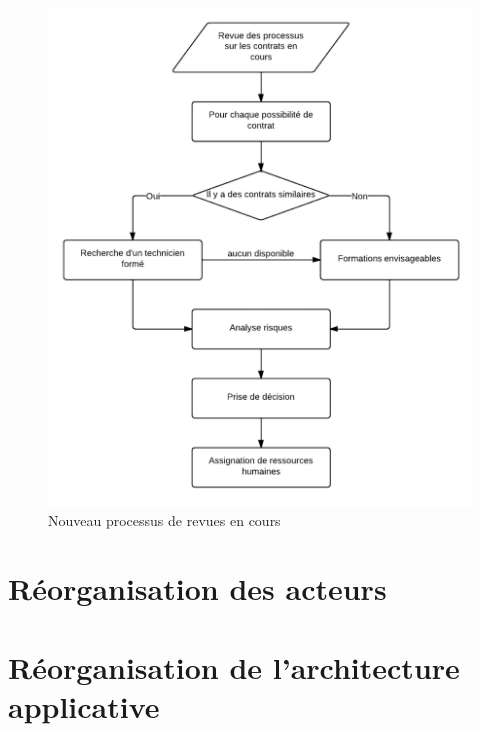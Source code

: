 \begin{figure}[h!]
	\centering
	\includegraphics[width=0.45\linewidth]{images/processus_revues_actuels.png}
	\caption{Nouveau processus de revues en cours}
	\label{fig:processusRevueCours}
\end{figure}

\section{Réorganisation des acteurs}

\section{Réorganisation de l'architecture applicative}
